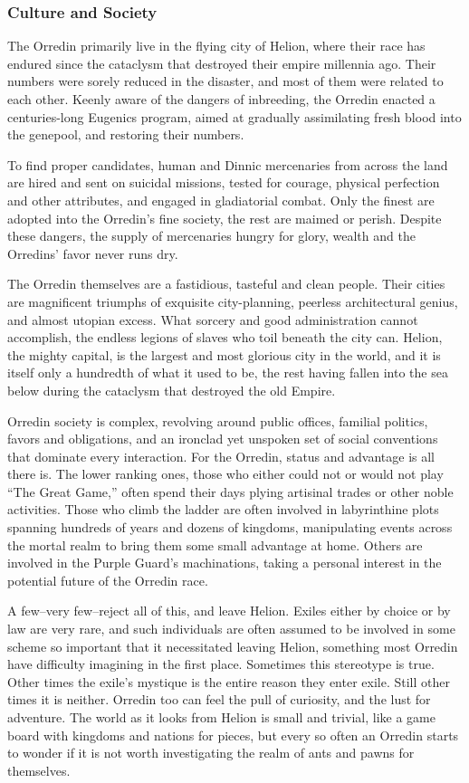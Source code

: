 \documentclass[oneside,11pt,english]{book}
\begin{document}
\subsubsection*{Culture and Society} 
The Orredin primarily live in the flying city of Helion, where their race has
endured since the cataclysm that destroyed their empire millennia ago. Their
numbers were sorely reduced in the disaster, and most of them were related to
each other. Keenly aware of the dangers of inbreeding, the Orredin enacted a
centuries-long Eugenics program, aimed at gradually assimilating fresh blood
into the genepool, and restoring their numbers.

To find proper candidates, human and Dinnic mercenaries from across the land 
are hired and sent on suicidal missions, tested for courage, physical perfection and other attributes, and 
engaged in gladiatorial combat. Only the finest are adopted into the Orredin’s fine society, the rest are 
maimed or perish. Despite these dangers, the supply of mercenaries hungry for glory, wealth and the 
Orredins’ favor never runs dry. 

The Orredin themselves are a fastidious, tasteful and clean people. Their cities are magnificent triumphs 
of exquisite city-planning, peerless architectural genius, and almost utopian excess. What sorcery and 
good administration cannot accomplish, the endless legions of slaves who toil beneath the city can. 
Helion, the mighty capital, is the largest and most glorious city in the world, and it is itself only a 
hundredth of what it used to be, the rest having fallen into the sea below during the cataclysm that 
destroyed the old Empire. 

Orredin society is complex, revolving around public offices, familial politics, favors and obligations, and 
an ironclad yet unspoken set of social conventions that dominate every interaction. For the Orredin, status 
and advantage is all there is. The lower ranking ones, those who either could not or would not play “The 
Great Game,” often spend their days plying artisinal trades or other noble activities. Those who climb the 
ladder are often involved in labyrinthine plots spanning hundreds of years and dozens of kingdoms, 
manipulating events across the mortal realm to bring them some small advantage at home. Others are 
involved in the Purple Guard’s machinations, taking a personal interest in the potential future of the 
Orredin race. 

A few--very few--reject all of this, and leave Helion. Exiles either by choice or by law are very rare, and 
such individuals are often assumed to be involved in some scheme so important that it necessitated 
leaving Helion, something most Orredin have difficulty imagining in the first place. Sometimes this 
stereotype is true. Other times the exile’s mystique is the entire reason they enter exile. Still other times it 
is neither. Orredin too can feel the pull of curiosity, and the lust for adventure. The world as it looks from 
Helion is small and trivial, like a game board with kingdoms and nations for pieces, but every so often an 
Orredin starts to wonder if it is not worth investigating the realm of ants and pawns for themselves. 
\end{document}
